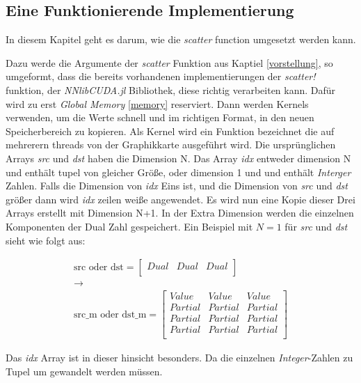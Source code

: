 \subsection{Eine Funktionierende Implementierung}

In diesem Kapitel geht es darum, wie die \textit{scatter} function umgesetzt werden kann.

Dazu werde die Argumente der \textit{scatter} Funktion aus Kaptiel \ref{vorstellung}, so
umgeformt, 
dass die bereits vorhandenen implementierungen der \textit{scatter!} funktion, der \textit{NNlibCUDA.jl} Bibliothek, 
diese richtig verarbeiten kann.
Dafür wird zu erst \textit{Global Memory} \ref{memory} reserviert.  Dann werden Kernels verwenden, 
um die Werte schnell und im richtigen Format, in den neuen Speicherbereich zu kopieren.
Als Kernel wird ein Funktion bezeichnet die auf mehrerern threads von der Graphikkarte ausgeführt wird.
Die ursprünglichen Arrays \textit{src} und \textit{dst} haben die Dimension N.
Das Array \textit{idx} entweder dimension N und enthält tupel von gleicher Größe,
oder dimension 1 und und enthält \textit{Interger} Zahlen.
Falls die Dimension von \textit{idx} Eins ist, und die Dimension von \textit{src}
und \textit{dst} größer dann wird \textit{idx} zeilen weiße angewendet.
Es wird nun eine Kopie dieser Drei Arrays erstellt mit Dimension N+1.
In der Extra Dimension werden die einzelnen Komponenten der Dual Zahl gespeichert.
Ein Beispiel mit $N = 1$ für \textit{src} und \textit{dst} sieht wie folgt aus:

\begin{gather}
\text{src oder dst} = 
\begin{bmatrix}
Dual & Dual & Dual\\
\end{bmatrix}\\
\rightarrow\\
\text{src\_m oder dst\_m} = 
\begin{bmatrix}
Value   & Value   & Value   \\
Partial & Partial & Partial \\
Partial & Partial & Partial \\
Partial & Partial & Partial \\
\end{bmatrix}
\end{gather}

Das \textit{idx} Array ist in dieser hinsicht besonders.
Da die einzelnen \textit{Integer}-Zahlen zu Tupel um gewandelt werden müssen. 

